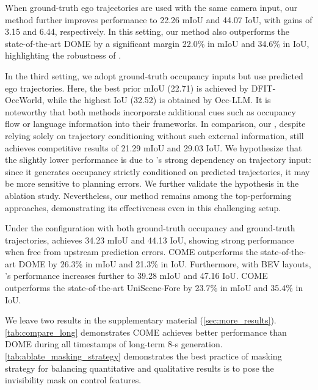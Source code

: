 When ground-truth ego trajectories are used with the same camera input, our method further improves performance to 22.26 mIoU and 44.07 IoU, with gains of 3.15 and 6.44, respectively.
In this setting, our method also outperforms the state-of-the-art DOME by a significant margin 22.0\% in mIoU and 34.6\% in IoU, highlighting the robustness of \mtd{}.

In the third setting, we adopt ground-truth occupancy inputs but use predicted ego trajectories.
Here, the best prior mIoU (22.71) is achieved by DFIT-OccWorld, while the highest IoU (32.52) is obtained by Occ-LLM.
It is noteworthy that both methods incorporate additional cues such as occupancy flow or language information into their frameworks.
In comparison, our \mtd{}, despite relying solely on trajectory conditioning without such external information, still achieves competitive results of 21.29 mIoU and 29.03 IoU.
We hypothesize that the slightly lower performance is due to \mtd{}'s strong dependency on trajectory input: since it generates occupancy strictly conditioned on predicted trajectories, it may be more sensitive to planning errors. We further validate the hypothesis in the ablation study. 
Nevertheless, our method remains among the top-performing approaches, demonstrating its effectiveness even in this challenging setup.

Under the configuration with both ground-truth occupancy and ground-truth trajectories, \mtd{} achieves 34.23 mIoU and 44.13 IoU, showing strong performance when free from upstream prediction errors. COME outperforms the state-of-the-art DOME by 26.3\% in mIoU and 21.3\% in IoU.
Furthermore, with BEV layouts, \mtd{}'s performance increases further to 39.28 mIoU and 47.16 IoU. COME outperforms the state-of-the-art UniScene-Fore by 23.7\% in mIoU and 35.4\% in IoU.

We leave two results in the supplementary material (\cref{sec:more_results}). \cref{tab:compare_long} demonstrates COME achieves better performance than DOME during all timestamps of long-term 8-s generation. \cref{tab:ablate_masking_strategy} demonstrates the best practice of masking strategy for balancing quantitative and qualitative results is to pose the invisibility mask on control features. 

